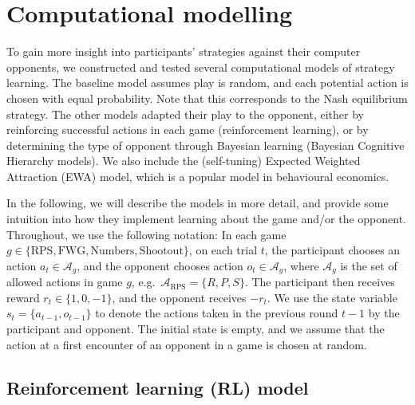 \documentclass[
  english,
  man,floatsintext]{apa6}
\begin{document}
\hypertarget{computational-modelling}{%
\section{Computational modelling}\label{computational-modelling}}

To gain more insight into participants' strategies against their computer opponents, we constructed and tested several computational models of strategy learning. The baseline model assumes play is random, and each potential action is chosen with equal probability. Note that this corresponds to the Nash equilibrium strategy. The other models adapted their play to the opponent, either by reinforcing successful actions in each game (reinforcement learning), or by determining the type of opponent through Bayesian learning (Bayesian Cognitive Hierarchy models). We also include the (self-tuning) Expected Weighted Attraction (EWA) model, which is a popular model in behavioural economics.

In the following, we will describe the models in more detail, and provide some intuition into how they implement learning about the game and/or the opponent. Throughout, we use the following notation: In each game \(g \in \{\text{RPS},\text{FWG}, \text{Numbers}, \text{Shootout} \}\), on each trial \(t\), the participant chooses an action \(a_t \in \mathcal{A}_g\), and the opponent chooses action \(o_t \in \mathcal{A}_g\), where \(\mathcal{A}_g\) is the set of allowed actions in game \(g\), e.g.~\(\mathcal{A}_\text{RPS} = \{R,P,S\}\). The participant then receives reward \(r_t \in \{1,0,-1\}\), and the opponent receives \(-r_t\). We use the state variable \(s_t = \{a_{t-1},o_{t-1}\}\) to denote the actions taken in the previous round \(t-1\) by the participant and opponent. The initial state is empty, and we assume that the action at a first encounter of an opponent in a game is chosen at random.

\hypertarget{reinforcement-learning-rl-model}{%
\subsection{Reinforcement learning (RL) model}\label{reinforcement-learning-rl-model}}
\end{document}
